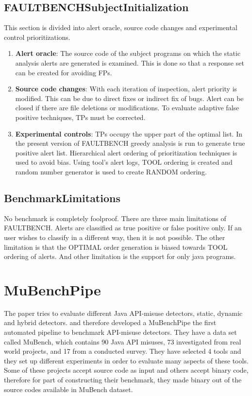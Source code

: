 \documentclass[authoryear,preprint]{sigplanconf}
\begin{document}
\subsection{FAULTBENCHSubjectInitialization}
This section is divided into alert oracle, source code changes and experimental control prioritizations.
\begin{enumerate}
\item \textbf{Alert oracle}: The source code of the subject programs on which the static analysis alerts are generated is examined. This is done so that a response set can be created for avoiding FPs.
\item \textbf{Source code changes}: With each iteration of inspection, alert priority is modified. This can be due to direct fixes or indirect fix of bugs. Alert can be closed if there are file deletions or modifications. To evaluate adaptive false positive techniques, TPs must be corrected.
\item \textbf{Experimental controls}: TPs occupy the upper part of the optimal list. In the present version of FAULTBENCH greedy analysis is run to generate true positive alert list. Hierarchical alert ordering of prioritization techniques is used to avoid bias. Using tool's alert logs, TOOL ordering is created and random number generator is used to create RANDOM ordering.
\end{enumerate}

\subsection{BenchmarkLimitations} 
No benchmark is completely foolproof. There are three main limitations of FAULTBENCH. Alerts are classified as true positive or false positive only. If an user wishes to classify in a different way, then it is not possible. The other limitation is that the OPTIMAL order generation is biased towards TOOL ordering of alerts. And other limitation is the support for only java programs.

\section{MuBenchPipe}
\label{sec:sec_mubenchpipe}

The paper tries to evaluate different Java API-misuse detectors, static, dynamic and hybrid detectors. and therefore developed a MuBenchPipe \cite{8338426} the first automated pipeline to benchmark API-misuse detectors. They have a data set called MuBench, which contains 90 Java API misuses, 73 investigated from real world projects, and 17 from a conducted survey. They have selected 4 tools and they set up different experiments in order to evaluate many aspects of these tools. Some of these projects accept source code as input and others accept binary code, therefore for part of constructing their benchmark, they made binary out of the source codes available in MuBench dataset. 
\end{document}
